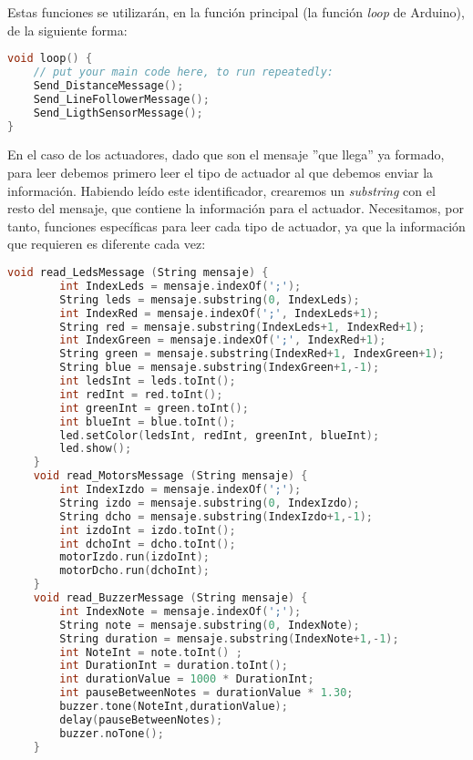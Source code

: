 Estas funciones se utilizarán, en la función principal (la función \textit{loop} de Arduino), de la siguiente forma:

\begin{lstlisting}[language=C,caption={Uso de las funciones para enviar la información de los sensores al programa PC}]
void loop() {
	// put your main code here, to run repeatedly:
	Send_DistanceMessage();
	Send_LineFollowerMessage(); 
	Send_LigthSensorMessage();
}
\end{lstlisting}


En el caso de los actuadores, dado que son el mensaje ''que llega'' ya formado, para leer debemos primero leer el tipo de actuador al que debemos enviar la información. Habiendo leído este identificador, crearemos un \textit{substring} con el resto del mensaje, que contiene la información para el actuador. Necesitamos, por tanto, funciones específicas para leer cada tipo de actuador, ya que la información que requieren es diferente cada vez:

\begin{lstlisting}[language=C,caption={Lectura de mensajes de los actuadores}]
	void read_LedsMessage (String mensaje) {
		int IndexLeds = mensaje.indexOf(';');
		String leds = mensaje.substring(0, IndexLeds);
		int IndexRed = mensaje.indexOf(';', IndexLeds+1); 
		String red = mensaje.substring(IndexLeds+1, IndexRed+1);
		int IndexGreen = mensaje.indexOf(';', IndexRed+1);
		String green = mensaje.substring(IndexRed+1, IndexGreen+1);
		String blue = mensaje.substring(IndexGreen+1,-1); 
		int ledsInt = leds.toInt();
		int redInt = red.toInt();
		int greenInt = green.toInt();
		int blueInt = blue.toInt();
		led.setColor(ledsInt, redInt, greenInt, blueInt);
		led.show();
	}	
	void read_MotorsMessage (String mensaje) {
		int IndexIzdo = mensaje.indexOf(';');
		String izdo = mensaje.substring(0, IndexIzdo);
		String dcho = mensaje.substring(IndexIzdo+1,-1);	
		int izdoInt = izdo.toInt();
		int dchoInt = dcho.toInt();
		motorIzdo.run(izdoInt);
		motorDcho.run(dchoInt);
	}
	void read_BuzzerMessage (String mensaje) {
		int IndexNote = mensaje.indexOf(';');
		String note = mensaje.substring(0, IndexNote);  
		String duration = mensaje.substring(IndexNote+1,-1);
		int NoteInt = note.toInt() ;
		int DurationInt = duration.toInt();	
		int durationValue = 1000 * DurationInt;  
		int pauseBetweenNotes = durationValue * 1.30;
		buzzer.tone(NoteInt,durationValue);
		delay(pauseBetweenNotes);
		buzzer.noTone();
	}	
\end{lstlisting}


